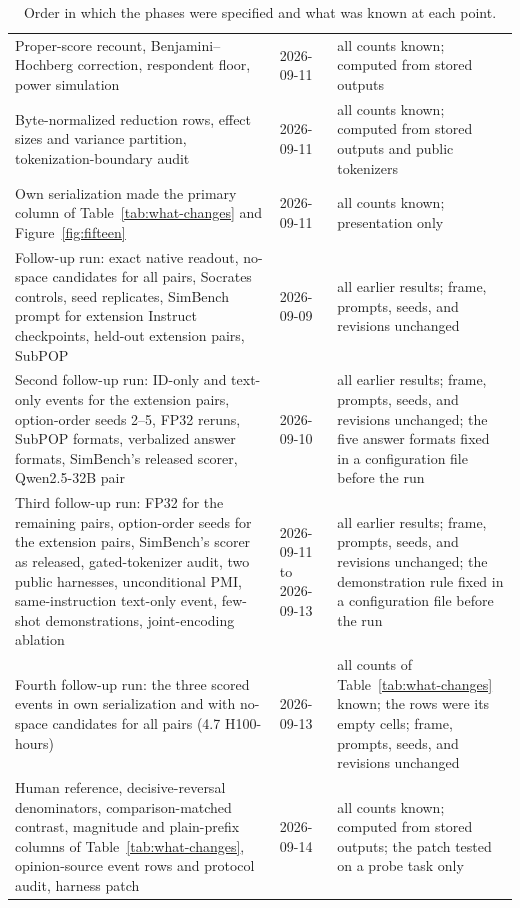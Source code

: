 \documentclass[11pt]{article}
\begin{document}
\begin{table}[t]
\begin{tabular}{@{}p{}p{}p{}@{}}
Proper-score recount, Benjamini--Hochberg correction, respondent floor, power simulation & 2026-09-11 & all counts known; computed from stored outputs \\
Byte-normalized reduction rows, effect sizes and variance partition, tokenization-boundary audit & 2026-09-11 & all counts known; computed from stored outputs and public tokenizers \\
Own serialization made the primary column of Table~\ref{tab:what-changes} and Figure~\ref{fig:fifteen} & 2026-09-11 & all counts known; presentation only \\
Follow-up run: exact native readout, no-space candidates for all pairs, Socrates controls, seed replicates, SimBench prompt for extension Instruct checkpoints, held-out extension pairs, SubPOP & 2026-09-09 & all earlier results; frame, prompts, seeds, and revisions unchanged \\
Second follow-up run: ID-only and text-only events for the extension pairs, option-order seeds 2--5, FP32 reruns, SubPOP formats, verbalized answer formats, SimBench's released scorer, Qwen2.5-32B pair & 2026-09-10 & all earlier results; frame, prompts, seeds, and revisions unchanged; the five answer formats fixed in a configuration file before the run \\
Third follow-up run: FP32 for the remaining pairs, option-order seeds for the extension pairs, SimBench's scorer as released, gated-tokenizer audit, two public harnesses, unconditional PMI, same-instruction text-only event, few-shot demonstrations, joint-encoding ablation & 2026-09-11 to 2026-09-13 & all earlier results; frame, prompts, seeds, and revisions unchanged; the demonstration rule fixed in a configuration file before the run \\
Fourth follow-up run: the three scored events in own serialization and with no-space candidates for all pairs (4.7 H100-hours) & 2026-09-13 & all counts of Table~\ref{tab:what-changes} known; the rows were its empty cells; frame, prompts, seeds, and revisions unchanged \\
Human reference, decisive-reversal denominators, comparison-matched contrast, magnitude and plain-prefix columns of Table~\ref{tab:what-changes}, opinion-source event rows and protocol audit, harness patch & 2026-09-14 & all counts known; computed from stored outputs; the patch tested on a probe task only \\
\bottomrule
\end{tabular}
\caption{Order in which the phases were specified and what was known at each
point.}
\label{tab:timing}
\end{table}
\end{document}
